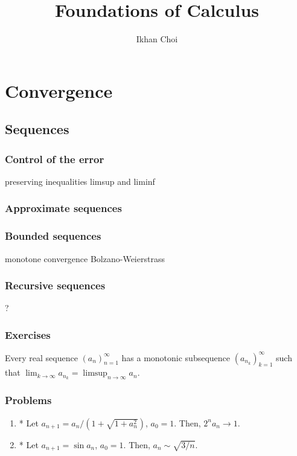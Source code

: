 \documentclass{../note}
\begin{document}
\title{Foundations of Calculus}
\author{Ikhan Choi}
\maketitle
\tableofcontents

\part{Convergence}
\chapter{Sequences}

\section{Control of the error}
preserving inequalities
limsup and liminf
\section{Approximate sequences}
\section{Bounded sequences}
monotone convergence
Bolzano-Weierstrass
\section{Recursive sequences}
?
\section*{Exercises}
\begin{prb}
Every real sequence $(a_n)_{n=1}^\infty$ has a monotonic subsequence $(a_{n_k})_{k=1}^\infty$ such that $\lim_{k\to\infty}a_{n_k}=\limsup_{n\to\infty}a_n$.
\end{prb}
\section*{Problems}
\begin{enumerate}
\item* Let $a_{n+1}=a_n/(1+\sqrt{1+a_n^2})$, $a_0=1$. Then, $2^na_n\to1$.
\item* Let $a_{n+1}=\sin a_n$, $a_0=1$. Then, $a_n\sim\sqrt{3/n}$.
\end{enumerate}
\end{document}
